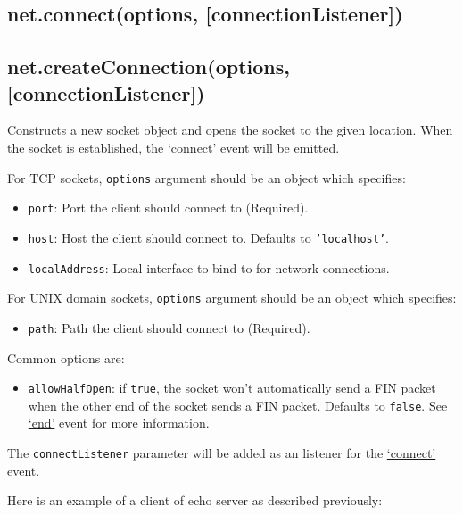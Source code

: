 \subsection{net.connect(options, {[}connectionListener{]})}

\subsection{net.createConnection(options, {[}connectionListener{]})}

Constructs a new socket object and opens the socket to the given
location. When the socket is established, the
\hyperref[net_event_connect]{`connect'} event will be emitted.

For TCP sockets, \texttt{options} argument should be an object which
specifies:

\begin{itemize}
\item
  \texttt{port}: Port the client should connect to (Required).
\item
  \texttt{host}: Host the client should connect to. Defaults to
  \texttt{'localhost'}.
\item
  \texttt{localAddress}: Local interface to bind to for network
  connections.
\end{itemize}

For UNIX domain sockets, \texttt{options} argument should be an object
which specifies:

\begin{itemize}
\item
  \texttt{path}: Path the client should connect to (Required).
\end{itemize}

Common options are:

\begin{itemize}
\item
  \texttt{allowHalfOpen}: if \texttt{true}, the socket won't
  automatically send a FIN packet when the other end of the socket sends
  a FIN packet. Defaults to \texttt{false}. See
  \hyperref[net_event_end]{`end'} event for more information.
\end{itemize}

The \texttt{connectListener} parameter will be added as an listener for
the \hyperref[net_event_connect]{`connect'} event.

Here is an example of a client of echo server as described previously:


